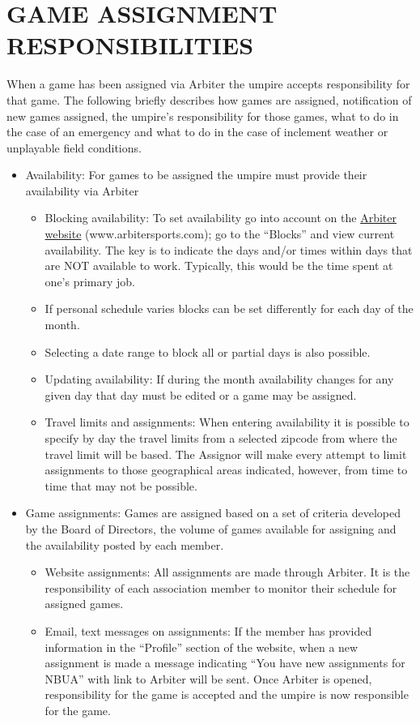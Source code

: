 \documentclass[letterpaper,11pt,colorlinks=true,allcolors=blue]{article}
\begin{document}
\section{GAME ASSIGNMENT RESPONSIBILITIES}
When a game has been assigned via Arbiter the umpire accepts responsibility for that game. The following briefly describes how games are assigned, notification of new games assigned, the umpire’s responsibility for those games, what to do in the case of an emergency and what to do in the case of inclement weather or unplayable field conditions.
\begin{itemize}
\item Availability: For games to be assigned the umpire must provide their availability via Arbiter
\begin{itemize}
\item  Blocking availability: To set availability go into account on the \href{http://www.ArbiterSports.com/}{Arbiter website} (www.arbitersports.com); go to the “Blocks” and view current availability. The key is to indicate the days and/or times within days that are NOT available to work. Typically, this would be the time spent at one’s primary job.
\item  If personal schedule varies blocks can be set differently for each day of the month.
\item  Selecting a date range to block all or partial days is also possible.
\item  Updating availability: If during the month availability changes for any given day that day must be edited or a game may be assigned.
\item  Travel limits and assignments: When entering availability it is possible to specify by day the travel limits from a selected zipcode from where the travel limit will be based. The Assignor will make every attempt to limit assignments to those geographical areas indicated, however, from time to time that may not be possible.
\end{itemize}
\item Game assignments: Games are assigned based on a set of criteria developed by the Board of Directors, the volume of games available for assigning and the availability posted by each member. 
\begin{itemize}
\item  Website assignments: All assignments are made through Arbiter. It is the responsibility of each association member to monitor their schedule for assigned games.
\item  Email, text messages on assignments: If the member has provided information in the “Profile” section of the website, when a new assignment is made a message indicating “You have new assignments for NBUA” with link to Arbiter will be sent. Once Arbiter is opened, responsibility for the game is accepted and the umpire is now responsible for the game. 

\end{itemize}
\end{itemize}
\end{document}
